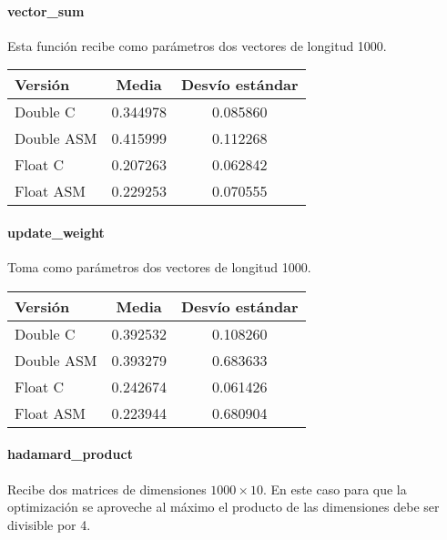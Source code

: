 \paragraph{vector\_sum}

Esta función recibe como parámetros dos vectores de longitud 1000.

\begin{center}
    \begin{tabular}{| l | c | c |}
                \hline
    Versión & Media & Desvío estándar \\
                \hline
    Double C & 0.344978 & 0.085860 \\
    Double ASM & 0.415999 & 0.112268 \\
    Float C & 0.207263 & 0.062842 \\
    Float ASM  & 0.229253 & 0.070555 \\
                \hline
            
        \end{tabular}
\end{center}


\paragraph{update\_weight}

Toma como parámetros dos vectores de longitud 1000.

\begin{center}
    \begin{tabular}{| l | c | c |}
                \hline
    Versión & Media & Desvío estándar \\
                \hline
    Double C & 0.392532 & 0.108260 \\
    Double ASM & 0.393279 & 0.683633 \\
    Float C & 0.242674 & 0.061426 \\
    Float ASM  & 0.223944 & 0.680904 \\
                \hline
            
        \end{tabular}
\end{center}


\paragraph{hadamard\_product}

Recibe dos matrices de dimensiones $1000\times 10$. En este caso para que la optimización se aproveche al máximo el producto de las dimensiones debe ser divisible por 4.

